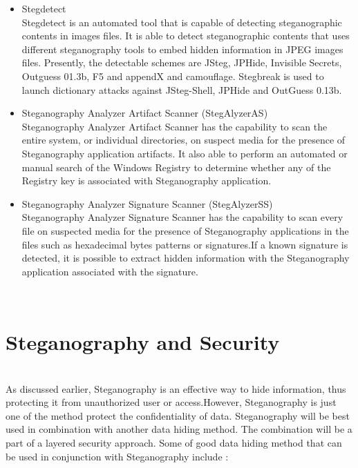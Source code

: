 \documentclass[conference, compsoc]{IEEEtran}
\begin{document}
\begin{itemize}
\item Stegdetect\\
	  Stegdetect is an automated tool that is capable of 				  detecting steganographic contents in images files. It is 			  able to detect steganographic contents that uses different 		  steganography tools to embed hidden information in JPEG 			  images files. Presently, the detectable schemes are JSteg, 		  JPHide, Invisible Secrets, Outguess 01.3b, F5 and appendX 		  and camouflage. Stegbreak is used to launch dictionary 			  attacks against JSteg-Shell, JPHide and OutGuess 0.13b.\\
\item Steganography Analyzer Artifact Scanner (StegAlyzerAS)\\
      Steganography Analyzer Artifact Scanner has the capability 		  to scan the entire system, or individual directories, on 			  suspect media for the presence of Steganography application 	  artifacts. It also able to perform an automated or manual 		  search of the Windows Registry to determine whether any of 		  the Registry key is associated with Steganography 				  application.\\
\item Steganography Analyzer Signature Scanner (StegAlyzerSS)\\
      Steganography Analyzer Signature Scanner has the capability 	  to scan every file on suspected media for the presence of 		  Steganography applications in the files such as hexadecimal 	  bytes patterns or signatures.If a known signature is 				  detected, it is possible to extract hidden information with 	  the Steganography application associated with the 				  signature.     	   
\end{itemize} 
\\
\section{Steganography and Security}\\
As discussed earlier, Steganography is an effective way to hide information, thus protecting it from unauthorized user or access.However, Steganography is just one of the method protect the confidentiality of data. Steganography will be best used in combination with another data hiding method. The combination will be a part of a layered security approach. Some of good data hiding method that can be used in conjunction with Steganography include :\\
\end{document}
